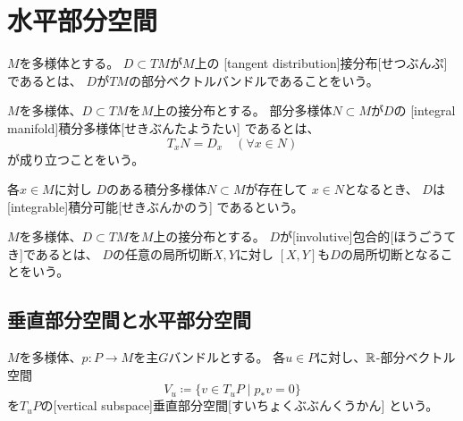 \documentclass[report]{jlreq}
\begin{document}
%
\section{水平部分空間}

\begin{definition}[接分布]
    $M$を多様体とする。
    $D \subset TM$が$M$上の
    [tangent distribution]{接分布}[せつぶんぷ]
    であるとは、
    $D$が$TM$の部分ベクトルバンドルであることをいう。
\end{definition}

\begin{definition}[積分多様体]
    $M$を多様体、$D \subset TM$を$M$上の接分布とする。
    部分多様体$N \subset M$が$D$の
    [integral manifold]{積分多様体}[せきぶんたようたい]
    であるとは、
    \begin{equation}
        T_xN = D_x
            \quad
            (\forall x \in N)
    \end{equation}
    が成り立つことをいう。

    各$x \in M$に対し
    $D$のある積分多様体$N \subset M$が存在して
    $x \in N$となるとき、
    $D$は[integrable]{積分可能}[せきぶんかのう]
    であるという。
\end{definition}

\begin{definition}[包合的]
    $M$を多様体、$D \subset TM$を$M$上の接分布とする。
    $D$が[involutive]{包合的}[ほうごうてき]であるとは、
    $D$の任意の局所切断$X, Y$に対し
    $[X, Y]$も$D$の局所切断となることをいう。
\end{definition}

\begin{theorem}[Frobenius]
    \TODO{}
\end{theorem}

\subsection{垂直部分空間と水平部分空間}

\begin{definition}[垂直部分空間]
    $M$を多様体、$p \colon P \to M$を主$G$バンドルとする。
    各$u \in P$に対し、$\mathbb{R}$-部分ベクトル空間
    \begin{equation}
        V_u \coloneqq \{
            v \in T_uP \mid p_* v = 0
        \}
    \end{equation}
    を$T_uP$の[vertical subspace]{垂直部分空間}[すいちょくぶぶんくうかん]
    という。
\end{definition}
\end{document}
